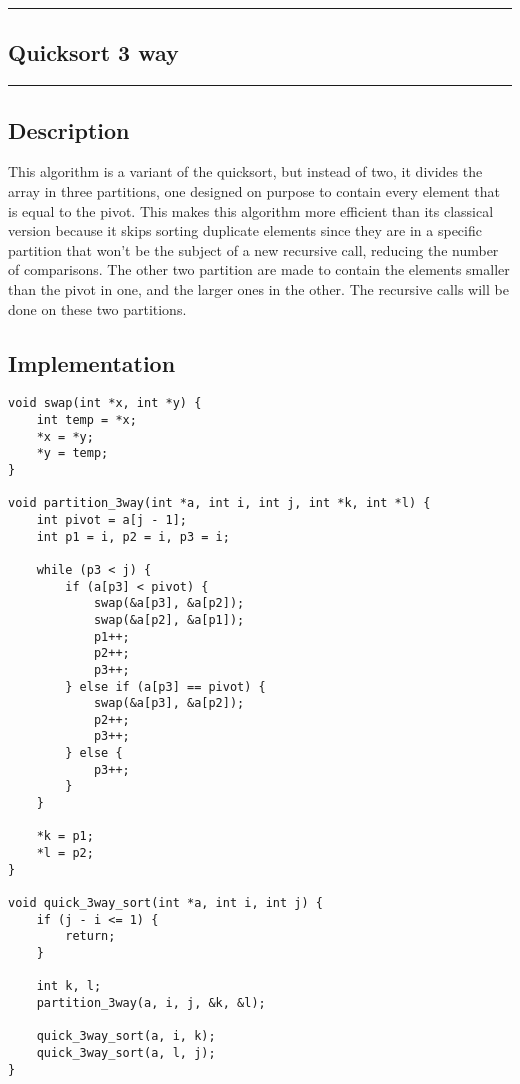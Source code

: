{\color{gray}\hrule}
\begin{center}
\section{Quicksort 3 way}
\bigskip
\end{center}
{\color{gray}\hrule}
\begin{multicols}{2}

\subsection{Description}
 This algorithm is a variant of the quicksort, but instead of two, it divides the array in three partitions, one designed on purpose to contain every element that is equal to the pivot. This makes this algorithm more efficient than its classical version because it skips sorting duplicate elements since they are in a specific partition that won't be the subject of a new recursive call, reducing the number of comparisons. The other two partition are made to contain the elements smaller than the pivot in one, and the larger ones in the other. The recursive calls will be done on these two partitions.

\subsection{Implementation}
\begin{verbatim}
void swap(int *x, int *y) {
    int temp = *x;
    *x = *y;
    *y = temp;
}

void partition_3way(int *a, int i, int j, int *k, int *l) {
    int pivot = a[j - 1];
    int p1 = i, p2 = i, p3 = i;

    while (p3 < j) {
        if (a[p3] < pivot) {
            swap(&a[p3], &a[p2]);
            swap(&a[p2], &a[p1]);
            p1++;
            p2++;
            p3++;
        } else if (a[p3] == pivot) {
            swap(&a[p3], &a[p2]);
            p2++;
            p3++;
        } else {
            p3++;
        }
    }

    *k = p1;
    *l = p2;
}

void quick_3way_sort(int *a, int i, int j) {
    if (j - i <= 1) {
        return;
    }

    int k, l;
    partition_3way(a, i, j, &k, &l);

    quick_3way_sort(a, i, k);
    quick_3way_sort(a, l, j);
}
\end{verbatim}


\end{multicols}
